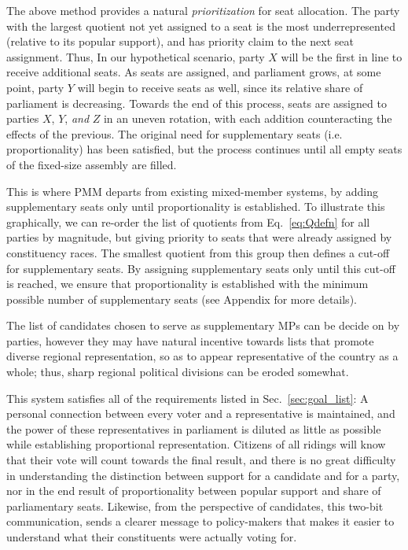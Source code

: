 \documentclass[DIV=calc, paper=a4, fontsize=11pt, twocolumn]{scrartcl}	 %
\begin{document}
The above method provides a natural \emph{prioritization} for seat allocation. The party with the largest quotient not yet assigned to a seat is the most underrepresented (relative to its popular support), and has priority claim to the next seat assignment.
Thus, In our hypothetical scenario, party $X$ will be the first in line to receive additional seats. As seats are assigned, and parliament grows, at some point, party $Y$ will begin to receive seats as well, since its relative share of parliament is decreasing. 
Towards the end of this process, seats are assigned to parties $X$, $Y$, \emph{and} $Z$ in an uneven rotation, with each addition counteracting the effects of the previous. The original need for supplementary seats (i.e. proportionality) has been satisfied, but the process continues until all empty seats of the fixed-size assembly are filled. 

This is where PMM departs from existing mixed-member systems, by adding supplementary seats only until proportionality is established. To illustrate this graphically, we can re-order the list of quotients from Eq.~\ref{eq:Qdefn} for all parties by magnitude, but giving priority to seats that were already assigned by constituency races. The smallest quotient from this group then defines a cut-off for supplementary seats. By assigning supplementary seats only until this cut-off is reached, we ensure that proportionality is established with the minimum possible number of supplementary seats (see Appendix for more details). 

The list of candidates chosen to serve as supplementary MPs can be decide on by parties, however they may have natural incentive towards lists that promote diverse regional representation, so as to appear representative of the country as a whole; thus, sharp regional political divisions can be eroded somewhat.

This system satisfies all of the requirements listed in Sec.~\ref{sec:goal_list}: A personal connection between every voter and a representative is maintained, and the power of these representatives in parliament is diluted as little as possible while establishing proportional representation. 
Citizens of all ridings will know that their vote will count towards the final result, and there is no great difficulty in understanding the  distinction between support for a candidate and for a party, nor in the end result of proportionality between popular support and share of parliamentary seats.
Likewise, from the perspective of candidates, this two-bit communication, sends a clearer message to policy-makers that makes it easier to understand what their constituents were actually voting for.
\end{document}

